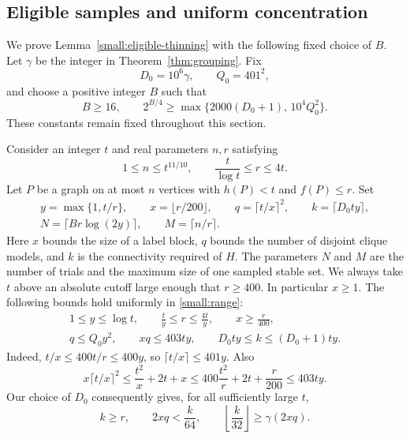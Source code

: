 \subsection{Eligible samples and uniform concentration}

We prove Lemma~\ref{small:eligible-thinning} with the following fixed
choice of $B$. Let $\gamma$ be the integer in
Theorem~\ref{thm:grouping}. Fix
\begin{equation}\label{small:constants}
 D_0=10^6\gamma,\qquad Q_0=401^2,
\end{equation}
and choose a positive integer $B$ such that
\begin{equation}\label{small:B-choice}
 B\ge16,\qquad
 2^{B/4}\ge
 \max\bigl\{2000(D_0+1),\,10^4Q_0^2\bigr\}.
\end{equation}
These constants remain fixed throughout this section.

Consider an integer $t$ and real parameters $n,r$ satisfying
\begin{equation}\label{small:range}
 1\le n\le t^{11/10},\qquad
 \frac{t}{\log t}\le r\le4t.
\end{equation}
Let $P$ be a graph on at most $n$ vertices with $h(P)<t$ and $f(P)\le r$.
Set
\begin{equation}\label{small:parameters}
 \begin{gathered}
 y=\max\{1,t/r\},\qquad x=\lfloor r/200\rfloor,
 \qquad q=\lceil t/x\rceil^2,\qquad k=\lceil D_0ty\rceil,\\
 N=\lceil Br\log(2y)\rceil,\qquad M=\lceil n/r\rceil.
 \end{gathered}
\end{equation}
Here $x$ bounds the size of a label block, $q$ bounds the number of
disjoint clique models, and $k$ is the connectivity required of $H$.
The parameters $N$ and $M$ are the number of trials and the maximum
size of one sampled stable set.
We always take $t$ above an absolute cutoff large enough that $r\ge400$.
In particular $x\ge1$. The following bounds hold uniformly in
\eqref{small:range}:
\begin{equation}\label{small:parameter-bounds}
 \begin{gathered}
 1\le y\le\log t,\qquad \frac{t}{y}\le r\le\frac{4t}{y},\qquad
 x\ge\frac r{400},\\
 q\le Q_0y^2,\qquad xq\le403ty,\qquad
 D_0ty\le k\le(D_0+1)ty.
 \end{gathered}
\end{equation}
Indeed, $t/x\le400t/r\le400y$, so
$\lceil t/x\rceil\le401y$. Also
\[
 x\lceil t/x\rceil^2
 \le\frac{t^2}{x}+2t+x
 \le400\frac{t^2}{r}+2t+\frac r{200}
 \le403ty.
\]
Our choice of $D_0$ consequently gives, for all sufficiently large $t$,
\begin{equation}\label{small:attachment-budget}
 k\ge r,\qquad 2xq<\frac{k}{64},\qquad
 \left\lfloor\frac{k}{32}\right\rfloor\ge\gamma(2xq).
\end{equation}

